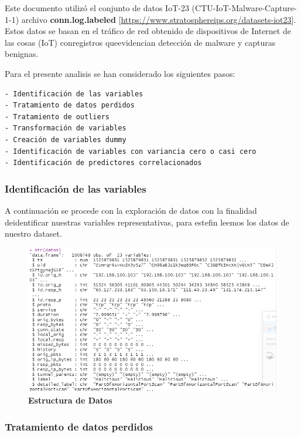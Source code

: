 \documentclass[
  10pt,
]{article}
\begin{document}
Este documento utilizó el conjunto de datos IoT-23
(CTU-IoT-Malware-Capture-1-1) archivo \textbf{conn.log.labeled}
{[}\url{https://www.stratosphereips.org/datasets-iot23}{]}. Estos datos
se basan en el tráfico de red obtenido de dispositivos de Internet de
las cosas (IoT) conregistros queevidencian detección de malware y
capturas benignas.

Para el presente analisis se han considerado los siguientes pasos:

\begin{verbatim}
- Identificación de las variables
- Tratamiento de datos perdidos
- Tratamiento de outliers
- Transformación de variables
- Creación de variables dummy
- Identificación de variables con variancia cero o casi cero
- Identificación de predictores correlacionados
\end{verbatim}

\hypertarget{identificaciuxf3n-de-las-variables}{%
\subsubsection{\texorpdfstring{\textbf{Identificación de las
variables}}{Identificación de las variables}}\label{identificaciuxf3n-de-las-variables}}

A continuación se procede con la exploración de datos con la finalidad
deidentificar nuestras variables representativas, para estefin leemos
los datos de nuestro dataset.

\begin{figure}
\centering
\includegraphics{Resumen_Estructura_Datos.PNG}
\caption{\textbf{Estructura de Datos}}
\end{figure}

\hypertarget{tratamiento-de-datos-perdidos}{%
\subsubsection{\texorpdfstring{\textbf{Tratamiento de datos
perdidos}}{Tratamiento de datos perdidos}}\label{tratamiento-de-datos-perdidos}}
\end{document}
